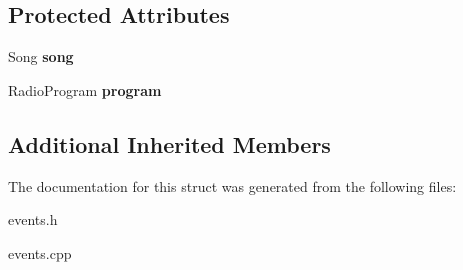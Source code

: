 \subsection*{Protected Attributes}
\begin{DoxyCompactItemize}
\item 
Song {\bfseries song}\hypertarget{struct_play_event___a7f398c1e252f22dcb6084120f64f627a}{}\label{struct_play_event___a7f398c1e252f22dcb6084120f64f627a}

\item 
Radio\+Program {\bfseries program}\hypertarget{struct_play_event___aaeb553f33dece56c8a0e7caa7ef755b9}{}\label{struct_play_event___aaeb553f33dece56c8a0e7caa7ef755b9}

\end{DoxyCompactItemize}
\subsection*{Additional Inherited Members}


The documentation for this struct was generated from the following files\+:\begin{DoxyCompactItemize}
\item 
events.\+h\item 
events.\+cpp\end{DoxyCompactItemize}

